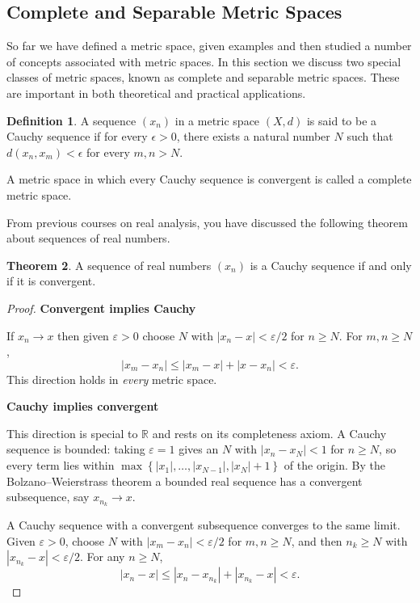 \documentclass[11pt,a4paper]{article}
\theoremstyle{definition}
\newtheorem{thm}{Theorem}[subsection]
\newtheorem{defn}[thm]{Definition}
\newcommand{\subhead}[1]{%
  \par\medskip\noindent\textbf{#1}\par\nobreak\smallskip}
\begin{document}
\subsection{Complete and Separable Metric Spaces}
So far we have defined a metric space, given examples and then studied a number of concepts associated with metric spaces. In this section we discuss two special classes of metric spaces, known as complete and separable metric spaces. These are important in both theoretical and practical applications.


\begin{defn}
A sequence $(x_n)$ in a metric space $(X,d)$ is said to be a Cauchy sequence if for every $\epsilon >0$, there exists a natural number $N$ such that $d(x_n,x_m)<\epsilon$ for every $m,n>N$.

A metric space in which every Cauchy sequence is convergent is called a complete metric space.
\end{defn}

From previous courses on real analysis, you have discussed the following theorem about sequences of real numbers.

\begin{thm}
A sequence of real numbers $(x_n)$ is a Cauchy sequence if and only if it is
convergent.
\end{thm}

\begin{proof}
\subhead{Convergent implies Cauchy}
If $x_n\rightarrow x$ then given $\varepsilon>0$ choose $N$ with
$\left|x_n-x\right|<\varepsilon/2$ for $n\geq N$. For $m,n\geq N$,
$$\left|x_m-x_n\right| \leq \left|x_m-x\right| + \left|x-x_n\right| < \varepsilon .$$
This direction holds in \emph{every} metric space.

\subhead{Cauchy implies convergent}
This direction is special to $\mathbb{R}$ and rests on its completeness axiom.
A Cauchy sequence is bounded: taking $\varepsilon=1$ gives an $N$ with
$\left|x_n-x_N\right|<1$ for $n\geq N$, so every term lies within
$\max\left\{\left|x_1\right|,\dots,\left|x_{N-1}\right|,\left|x_N\right|+1\right\}$
of the origin. By the Bolzano--Weierstrass theorem a bounded real sequence has a
convergent subsequence, say $x_{n_k}\rightarrow x$.

A Cauchy sequence with a convergent subsequence converges to the same limit.
Given $\varepsilon>0$, choose $N$ with $\left|x_m-x_n\right|<\varepsilon/2$ for
$m,n\geq N$, and then $n_k\geq N$ with $\left|x_{n_k}-x\right|<\varepsilon/2$.
For any $n\geq N$,
$$\left|x_n-x\right| \leq \left|x_n-x_{n_k}\right| + \left|x_{n_k}-x\right| < \varepsilon .$$
\end{proof}
\end{document}
